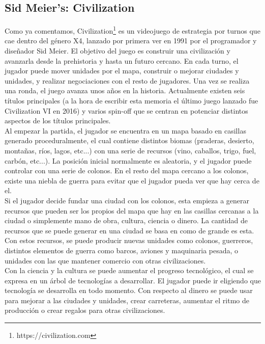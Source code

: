 \subsection{Sid Meier's: Civilization}\label{subsec:civ}

Como ya comentamos, Civilization\footnote{https://civilization.com} es un videojuego de estrategia por turnos que cae dentro del género X4, lanzado por primera ver en 1991 por el programador y diseñador Sid Meier. El objetivo del juego es construir una civilización y avanzarla desde la prehistoria y hasta un futuro cercano. En cada turno, el jugador puede mover unidades por el mapa, construir o mejorar ciudades y unidades, y realizar negociaciones con el resto de jugadores. Una vez se realiza una ronda, el juego avanza unos años en la historia. Actualmente existen seis títulos principales (a la hora de escribir esta memoria el último juego lanzado fue Civilization VI en 2016) y varios spin-off que se centran en potenciar distintos aspectos de los títulos principales. \\

Al empezar la partida, el jugador se encuentra en un mapa basado en casillas generado proceduralmente, el cual contiene distintos biomas (praderas, desierto, montañas, ríos, lagos, etc...) con una serie de recursos (vino, caballos, trigo, fuel, carbón, etc...). La posición inicial normalmente es aleatoria, y el jugador puede controlar con una serie de colonos. En el resto del mapa cercano a los colonos, existe una niebla de guerra para evitar que el jugador pueda ver que hay cerca de el. \\

Si el jugador decide fundar una ciudad con los colonos, esta empieza a generar recursos que pueden ser los propios del mapa que hay en las casillas cercanas a la ciudad o simplemente mano de obra, cultura, ciencia o dinero. La cantidad de recursos que se puede generar en una ciudad se basa en como de grande es esta. Con estos recursos, se puede producir nuevas unidades como colonos, guerreros, distintos elementos de guerra como barcos, aviones y maquinaria pesada, o unidades con las que mantener comercio con otras civilizaciones. \\

Con la ciencia y la cultura se puede aumentar el progreso tecnológico, el cual se expresa en un árbol de tecnologías a desarrollar. El jugador puede ir eligiendo que tecnología se desarrolla en todo momento. Con respecto al dinero se puede usar para mejorar a las ciudades y unidades, crear carreteras, aumentar el ritmo de producción o crear regalos para otras civilizaciones. \\

